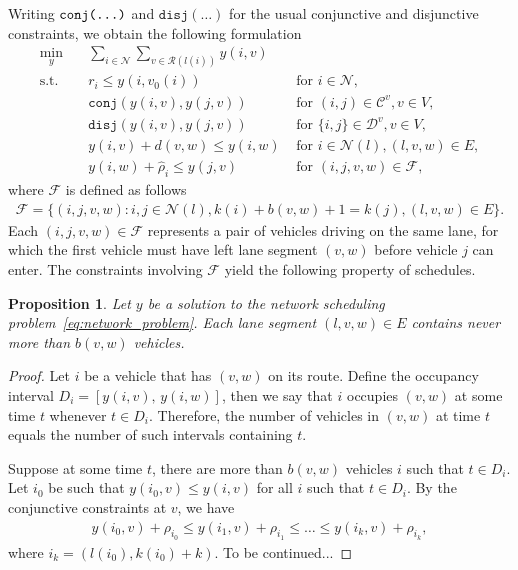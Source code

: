 \documentclass{article}
\theoremstyle{definition}
\theoremstyle{plain}
\newtheorem{proposition}{Proposition}
\begin{document}
Writing $\texttt{conj(\dots)}$ and $\texttt{disj}(\dots)$ for the usual conjunctive and disjunctive constraints, we obtain the following formulation
\begin{subequations}\label{eq:network_problem}
\begin{align}
  \min_{y} \quad & \sum_{i \in \mathcal{N}} \sum_{v \in \mathcal{R}(l(i))} y(i,v) & \\
  \text{s.t.} \quad & r_{i} \leq y(i, v_{0}(i)) & \text{ for } i \in \mathcal{N} , \\
  & \texttt{conj}(y(i,v), y(j,v)) & \text{ for } (i,j) \in \mathcal{C}^{v}, v \in V , \\
  & \texttt{disj}(y(i,v), y(j,v)) & \text{ for } \{i,j\} \in \mathcal{D}^{v}, v \in V , \\
  & y(i, v) + d(v, w) \leq y(i, w) & \text{ for } i \in \mathcal{N}(l), (l, v, w) \in E, \\
  & y(i, w) + \hat{\rho}_{i} \leq y(j, v) & \text{ for } (i,j,v,w) \in \mathcal{F} ,
\end{align}
\end{subequations}
where $\mathcal{F}$ is defined as follows
\begin{align*}
  \mathcal{F} = \{ (i,j,v,w) : i,j \in \mathcal{N}(l), k(i) + b(v,w) + 1 = k(j),  (l,v,w) \in E\} .
\end{align*}
Each $(i,j,v,w) \in \mathcal{F}$ represents a pair of vehicles driving on the
same lane, for which the first vehicle must have left lane segment $(v,w)$
before vehicle $j$ can enter.
%
The constraints involving $\mathcal{F}$ yield the following property of schedules.

\begin{proposition}
  Let $y$ be a solution to the network scheduling
  problem~\eqref{eq:network_problem}. Each lane segment $(l,v,w) \in E$ contains
  never more than $b(v,w)$ vehicles.
\end{proposition}
\begin{proof}
  Let $i$ be a vehicle that has $(v,w)$ on its route. Define the occupancy
  interval $D_{i} = [y(i,v), \, y(i,w)]$, then we say that $i$ occupies $(v,w)$
  at some time $t$ whenever $t \in D_{i}$.
  Therefore, the number of vehicles in $(v,w)$ at time $t$ equals the number of such
  intervals containing $t$.

  Suppose at some time $t$, there are more than $b(v,w)$ vehicles $i$ such that $t \in D_{i}$.
  Let $i_{0}$ be such that $y(i_{0},v) \leq y(i,v)$ for all $i$ such that $t \in D_{i}$.
  By the conjunctive constraints at $v$, we have
  \begin{align*}
    y(i_{0}, v) + \rho_{i_{0}} \leq y(i_{1}, v) + \rho_{i_{1}} \leq \dots \leq y(i_{k}, v) + \rho_{i_{k}} ,
  \end{align*}
  where $i_{k} = (l(i_{0}), k(i_{0}) + k)$.
  {\color{blue} To be continued...}
\end{proof}



% 
% 
\end{document}
